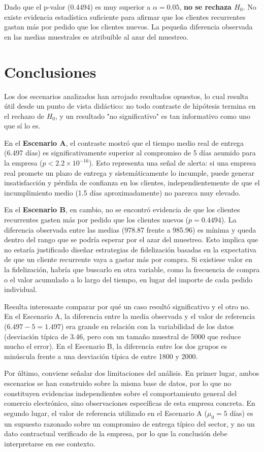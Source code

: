 \documentclass[11pt, a4paper]{article}
\begin{document}
Dado que el p-valor (0.4494) es muy superior a $\alpha = 0.05$, \textbf{no se rechaza $H_0$}. 
No existe evidencia estadística suficiente para afirmar que los clientes recurrentes gastan 
más por pedido que los clientes nuevos. La pequeña diferencia observada en las medias 
muestrales es atribuible al azar del muestreo.

\section{Conclusiones}

Los dos escenarios analizados han arrojado resultados opuestos, lo cual resulta 
útil desde un punto de vista didáctico: no todo contraste de hipótesis termina en el 
rechazo de $H_0$, y un resultado "no significativo" es tan informativo como uno que sí lo es.

En el \textbf{Escenario A}, el contraste mostró que el tiempo medio real de entrega 
(6.497 días) es significativamente superior al compromiso de 5 días asumido para la empresa 
($p < 2.2 \times 10^{-16}$). Esto representa una señal de alerta: si una empresa real 
promete un plazo de entrega y sistemáticamente lo incumple, puede generar insatisfacción y 
pérdida de confianza en los clientes, independientemente de que el incumplimiento medio 
(1.5 días aproximadamente) no parezca muy elevado.

En el \textbf{Escenario B}, en cambio, no se encontró evidencia de que los clientes 
recurrentes gasten más por pedido que los clientes nuevos ($p = 0.4494$). La diferencia 
observada entre las medias (978.87 frente a 985.96) es mínima y queda dentro del rango que 
se podría esperar por el azar del muestreo. Esto implica que no estaría justificado diseñar 
estrategias de fidelización basadas en la expectativa de que un cliente recurrente vaya a 
gastar más por compra. Si existiese valor en la fidelización, habría que buscarlo en otra 
variable, como la frecuencia de compra o el valor acumulado a lo largo del tiempo, en lugar 
del importe de cada pedido individual.

Resulta interesante comparar por qué un caso resultó significativo y el otro no. En el 
Escenario A, la diferencia entre la media observada y el valor de referencia 
($6.497 - 5 = 1.497$) era grande en relación con la variabilidad de los datos 
(desviación típica de 3.46, pero con un tamaño muestral de 5000 que reduce mucho el error). 
En el Escenario B, la diferencia entre los dos grupos es minúscula frente a una 
desviación típica de entre 1800 y 2000.

Por último, conviene señalar dos limitaciones del análisis. En primer lugar, ambos 
escenarios se han construido sobre la misma base de datos, por lo que no constituyen 
evidencias independientes sobre el comportamiento general del comercio electrónico, sino 
observaciones específicas de esta empresa concreta. En segundo lugar, el valor de 
referencia utilizado en el Escenario A ($\mu_0 = 5$ días) es un supuesto razonado sobre un 
compromiso de entrega típico del sector, y no un dato contractual verificado de la empresa, 
por lo que la conclusión debe interpretarse en ese contexto.
\end{document}
